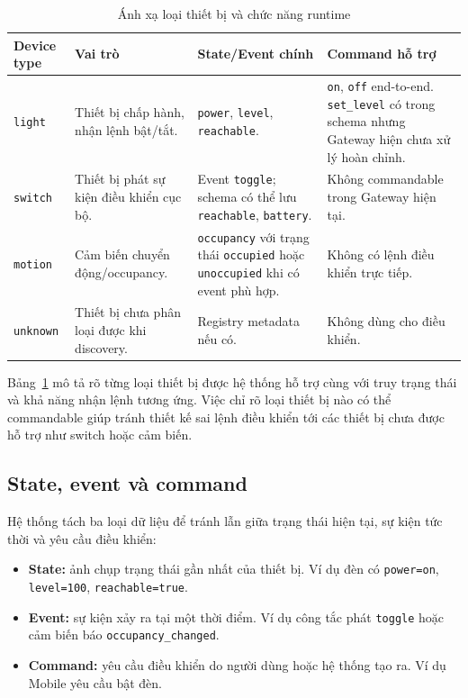 \begin{table}[H]
    \centering
    \caption{Ánh xạ loại thiết bị và chức năng runtime}
    \label{tab:ch3-device-roles}
    \footnotesize
    \setlength{\tabcolsep}{3pt}
    \begin{tabular}{|>{\raggedright\arraybackslash}p{2.1cm}|>{\raggedright\arraybackslash}p{3.5cm}|>{\raggedright\arraybackslash}p{4.1cm}|>{\raggedright\arraybackslash}p{3.6cm}|}
        \hline
        \textbf{Device type} & \textbf{Vai trò} & \textbf{State/Event chính} & \textbf{Command hỗ trợ} \\
        \hline
        \texttt{light} & Thiết bị chấp hành, nhận lệnh bật/tắt. & \texttt{power}, \texttt{level}, \texttt{reachable}. & \texttt{on}, \texttt{off} end-to-end. \texttt{set\_level} có trong schema nhưng Gateway hiện chưa xử lý hoàn chỉnh. \\
        \hline
        \texttt{switch} & Thiết bị phát sự kiện điều khiển cục bộ. & Event \texttt{toggle}; schema có thể lưu \texttt{reachable}, \texttt{battery}. & Không commandable trong Gateway hiện tại. \\
        \hline
        \texttt{motion} & Cảm biến chuyển động/occupancy. & \texttt{occupancy} với trạng thái \texttt{occupied} hoặc \texttt{unoccupied} khi có event phù hợp. & Không có lệnh điều khiển trực tiếp. \\
        \hline
        \texttt{unknown} & Thiết bị chưa phân loại được khi discovery. & Registry metadata nếu có. & Không dùng cho điều khiển. \\
        \hline
    \end{tabular}
    \setlength{\tabcolsep}{6pt}
\end{table}

Bảng~\ref{tab:ch3-device-roles} mô tả rõ từng loại thiết bị được hệ thống hỗ trợ cùng với truy trạng thái và khả năng nhận lệnh tương ứng. Việc chỉ rõ loại thiết bị nào có thể commandable giúp tránh thiết kế sai lệnh điều khiển tới các thiết bị chưa được hỗ trợ như switch hoặc cảm biến.

\subsection{State, event và command}
\label{sec:ch3-state-event-command}

Hệ thống tách ba loại dữ liệu để tránh lẫn giữa trạng thái hiện tại, sự kiện tức thời và yêu cầu điều khiển:

\begin{itemize}[leftmargin=1.2cm]
    \item \textbf{State:} ảnh chụp trạng thái gần nhất của thiết bị. Ví dụ đèn có \texttt{power=on}, \texttt{level=100}, \texttt{reachable=true}.
    \item \textbf{Event:} sự kiện xảy ra tại một thời điểm. Ví dụ công tắc phát \texttt{toggle} hoặc cảm biến báo \texttt{occupancy\_changed}.
    \item \textbf{Command:} yêu cầu điều khiển do người dùng hoặc hệ thống tạo ra. Ví dụ Mobile yêu cầu bật đèn.
\end{itemize}

